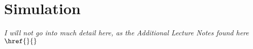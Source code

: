 \part{Simulation}
\textit{I will not go into much detail here, as the Additional Lecture Notes found here $\href{}{}$}
